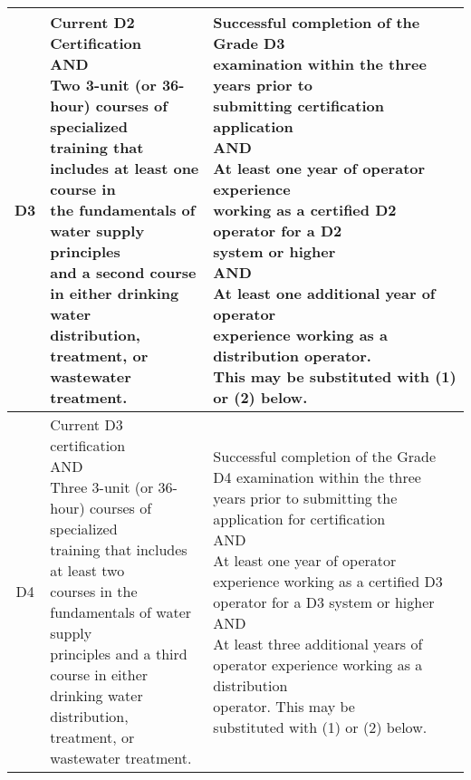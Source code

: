 \documentclass[10pt]{article}
\begin{document}
\begin{center}
\begin{table}[]
\begin{tabular}{|c|p{7.1cm}|p{7cm}|}
\hline
D3    & \makecell[l]{Current D2 Certification\\AND\\Two 3-unit (or 36-hour) courses of specialized\\ training that includes at least one course in\\the fundamentals of water supply principles \\and a second course in either drinking water\\distribution, treatment, or   wastewater\\treatment.} & \makecell[l]{Successful completion of the Grade D3\\examination within the three years prior to\\submitting certification application\\AND\\At least one year of operator experience\\working as a certified D2 operator for a D2\\system or higher\\AND\\At least one additional year of operator\\experience working as a distribution operator.\\This may be substituted with (1) or (2) below.}\\ 
\hline
D4    & \makecell[l]{Current D3 certification\\ AND \\Three 3-unit (or 36-hour) courses of specialized\\training that includes at least two\\courses in the fundamentals of water supply\\ principles and a third course in either\\drinking water distribution, treatment, or\\wastewater treatment.}& \makecell[l]{Successful completion of the Grade   D4 examination within the three years prior to   submitting the application for certification\\ AND\\ At least one year of operator experience working as a   certified D3 operator for a D3 system or higher\\ AND\\ At least three additional years of \\operator experience working as a distribution\\ operator. This may be \\substituted with (1) or (2) below.}\\ \hline

\end{tabular}
\end{table}
\end{center}
\end{document}
